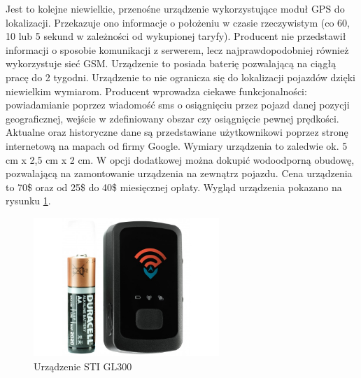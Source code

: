 \begin{itemize}
Jest to kolejne niewielkie, przenośne urządzenie wykorzystujące moduł GPS do lokalizacji. Przekazuje ono informacje o położeniu w czasie rzeczywistym (co 60, 10 lub 5 sekund w zależności od wykupionej taryfy). Producent nie przedstawił informacji o sposobie komunikacji z serwerem, lecz najprawdopodobniej również wykorzystuje sieć GSM. Urządzenie to posiada baterię pozwalającą na ciągłą pracę do 2 tygodni. Urządzenie to nie ogranicza się do lokalizacji pojazdów dzięki niewielkim wymiarom. Producent wprowadza ciekawe funkcjonalności: powiadamianie poprzez wiadomość sms o osiągnięciu przez pojazd danej pozycji geograficznej, wejście w zdefiniowany obszar czy osiągnięcie pewnej prędkości. Aktualne oraz historyczne dane są przedstawiane użytkownikowi poprzez stronę internetową na mapach od firmy Google.  Wymiary urządzenia to zaledwie ok. 5 cm x 2,5 cm x 2 cm.  W opcji dodatkowej można dokupić wodoodporną obudowę, pozwalającą na zamontowanie urządzenia na zewnątrz pojazdu. Cena urządzenia to 70\$ oraz od 25\$ do 40\$ miesięcznej opłaty. Wygląd urządzenia pokazano na rysunku \ref{fig:image_sti_gl300}.
\begin{figure}[h]
	\centering
	\includegraphics[width=7cm]{img/introduction/sti_gl300.jpg}
	\caption{Urządzenie STI GL300}
	\label{fig:image_sti_gl300}
\end{figure}
\end{itemize}